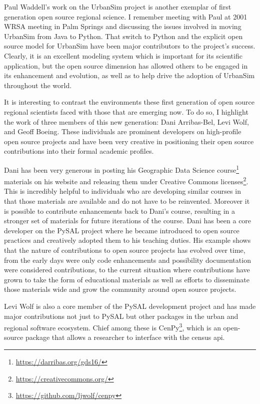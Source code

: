 \documentclass[11pt]{article}
\begin{document}
Paul Waddell's work on the UrbanSim project \citep{waddell_urbansim:_2002} is
another exemplar of first generation open source regional science. I remember
meeting with Paul at 2001 WRSA meeting in Palm Springs and discussing the
issues involved in moving UrbanSim from Java to Python. That switch to
Python and the explicit open source model for UrbanSim have been  major
contributors to the project's success. Clearly, it is an excellent modeling
system which is important for its scientific application, but the open source
dimension has allowed others to be engaged in its enhancement and evolution, as
well as to help drive the adoption of UrbanSim throughout the world.

It is interesting to contrast the environments these first generation of open
source regional scientists faced with those that are emerging now. To do so, I
highlight the work of three members of this new generation: Dani Arribas-Bel,
Levi Wolf, and Geoff Boeing. These individuals are prominent developers on
high-profile open source projects and have been very creative in positioning
their open source contributions into their formal academic profiles.

Dani has been very generous in posting his Geographic Data Science
course\footnote{\url{https://darribas.org/gds16/}} materials on his website and
releasing them under Creative Commons
licenses\footnote{\url{https://creativecommons.org/}}. This is incredibly
helpful to individuals who are developing similar courses in that those
materials are available and do not have to be reinvented. Moreover it is
possible to contribute enhancements back to Dani's course, resulting in a
stronger set of materials for future iterations of the course. Dani has been a
core developer on the PySAL project where he became introduced to open source
practices and creatively adopted them to his teaching duties. His example shows
that the nature of contributions to open source projects has evolved over time,
from the early days were only code enhancements and possibility documentation
were considered contributions, to the current situation where contributions have
grown to take the form of educational materials as well as efforts to
disseminate those materials wide and grow the community around open source
projects.


Levi Wolf is also a core member of the PySAL development project and has made
major contributions not just to PySAL but other packages in the urban and
regional software ecosystem. Chief among these is CenPy\footnote{\url{https://github.com/ljwolf/cenpy}}, which is an
open-source package that allows a researcher to interface with the census api.
\end{document}

